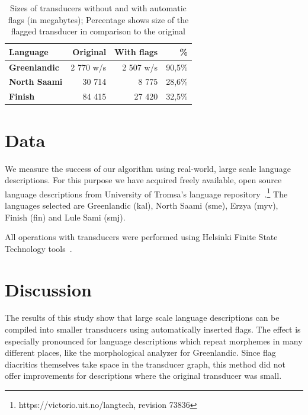 \documentclass[10pt, a4paper]{article}
\begin{document}
\begin{table}
    \centering
    \begin{tabular}{|l|r|r|r|}
        \hline
        \bf Language & \bf Original & \bf With flags & \bf \% \\
        \hline
        \bf Greenlandic & 2 770 w/s & 2 507 w/s & 90,5\%  \\
        \bf North Saami & 30 714 & 8 775 & 28,6\%  \\
        \bf Finish  & 84 415 & 27 420 & 32,5\%  \\

        \hline
    \end{tabular}
    \caption{Sizes of transducers without and with automatic flags (in megabytes); Percentage shows size of the flagged transducer in comparison to the original
    \label{table:lookup}}
\end{table}



\section{Data}
\label{sec:data}

We measure the success of our algorithm using real-world, large scale
language descriptions. For this purpose we have acquired freely
available, open source language descriptions from University of
Tromsa's language repository~\cite{moshagen2013building}.\footnote{https://victorio.uit.no/langtech, revision 73836} The
languages selected are Greenlandic (kal), North Saami (sme), Erzya
(myv), Finish (fin) and Lule Sami (smj).

All operations with transducers were performed using Helsinki Finite
State Technology tools~\cite{linden2011}.



\section{Discussion}
\label{sec:discussion}

The results of this study show that large scale language descriptions
can be compiled into smaller transducers using automatically inserted
flags. The effect is especially pronounced for language descriptions
which repeat morphemes in many different places, like the
morphological analyzer for Greenlandic. Since flag diacritics
themselves take space in the transducer graph, this method did not
offer improvements for descriptions where the original
transducer was small.
\end{document}
